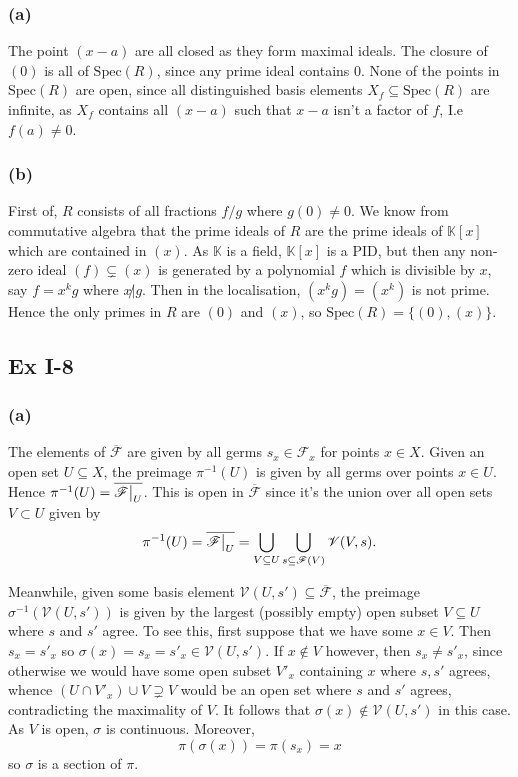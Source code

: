 \documentclass{article}
\newcommand\restr[2]{{%
  \left.\kern-\nulldelimiterspace %
  #1 %
  \vphantom{\big|} %
  \right|_{#2} %
  }}
\theoremstyle{definition}
\newcommand{\K}{\mathbb{K}}
\newcommand{\Spec}{\text{Spec}}
\begin{document}
\subsubsection*{(a)}

The point $(x - a)$ are all closed as they form maximal ideals. The closure of
$(0)$ is all of $\Spec(R)$, since any prime ideal contains $0$. None of the
points in $\Spec(R)$ are open, since all distinguished basis elements $X_f
\subseteq \Spec(R)$ are infinite, as $X_f$ contains all $(x - a)$ such that $x
- a$ isn't a factor of $f$, I.e $f(a) \not = 0$.

\subsubsection*{(b)}

First of, $R$ consists of all fractions $f/g$ where $g(0) \not = 0$. We know
from commutative algebra that the prime ideals of $R$ are the prime ideals of
$\K[x]$ which are contained in $(x)$. As $\K$ is a field, $\K[x]$ is a PID, but
then any non-zero ideal $(f) \subsetneq (x)$ is generated by a polynomial $f$
which is divisible by $x$, say $f = x^k g$ where $x \not | g$. Then in the
localisation, $(x^k g) = (x^k)$ is not prime. Hence the only primes in $R$ are
$(0)$ and $(x)$, so $\Spec(R) = \{(0), (x)\}$.

\subsection*{Ex I-8}
\subsubsection*{(a)}

The elements of $\overline{\mathscr{F}}$ are given by all germs $s_x \in
\mathscr{F}_x$ for points $x \in X$. Given an open set $U \subseteq X$, the
preimage $\pi^{-1}(U)$ is given by all germs over points $x \in U$. Hence
$\pi^{-1}(U) = \overline{\restr{\mathscr{F}}{U}}$. This is open in $\overline{\mathscr{F}}$
since it's the union over all open sets $V \subset U$ given by
\[
	\pi^{-1}(U) 
	= 
	\overline{\restr{\mathscr{F}}{U}}
	=
	\bigcup_{V \subseteq U}
	\bigcup_{s \subseteq \mathscr{F}(V)}
	\mathscr{V}(V, s).
\]

Meanwhile, given some basis element $\mathscr{V}(U, s') \subseteq
\overline{\mathscr{F}}$, the preimage $\sigma^{-1}(\mathscr{V}(U, s'))$ is
given by the largest (possibly empty) open subset $V \subseteq U$ where $s$ and
$s'$ agree. To see this, first suppose that we have some $x \in V$. Then $s_x =
s'_x$ so $\sigma(x) = s_x = s'_x \in \mathscr{V}(U, s')$. If $x \not \in V$
however, then $s_x \not = s'_x$, since otherwise we would have some open subset
$V'_x$ containing $x$ where $s, s'$ agrees, whence $(U \cap V'_x) \cup V
\supsetneq V$ would be an open set where $s$ and $s'$ agrees, contradicting the
maximality of $V$. It follows that $\sigma(x) \not \in \mathscr{V}(U, s')$ in
this case. As $V$ is open, $\sigma$ is continuous. Moreover, 
\[
	\pi(\sigma(x))
	=
	\pi(s_x)
	=
	x
\] 
so $\sigma$ is a section of $\pi$.
\end{document}
